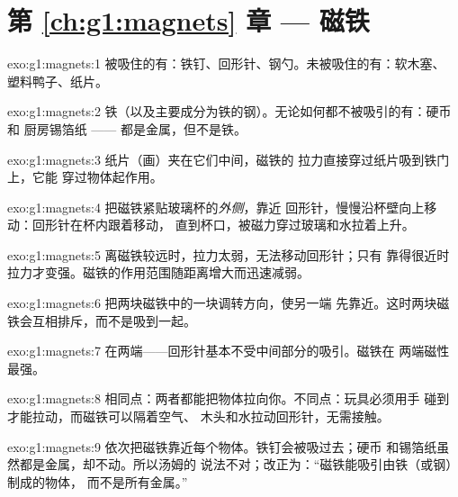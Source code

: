 \section*{第 \ref{ch:g1:magnets} 章 --- 磁铁}

\begin{solution}{exo:g1:magnets:1}
被吸住的有：铁钉、回形针、钢勺。未被吸住的有：软木塞、
塑料鸭子、纸片。
\end{solution}

\begin{solution}{exo:g1:magnets:2}
铁（以及主要成分为铁的钢）。无论如何都不被吸引的有：硬币和
厨房锡箔纸 —— 都是金属，但不是铁。
\end{solution}

\begin{solution}{exo:g1:magnets:3}
纸片（画）夹在它们中间，磁铁的
拉力直接穿过纸片吸到铁门上，它能
穿过物体起作用。
\end{solution}

\begin{solution}{exo:g1:magnets:4}
把磁铁紧贴玻璃杯的\emph{外侧}，靠近
回形针，慢慢沿杯壁向上移动：回形针在杯内跟着移动，
直到杯口，被磁力穿过玻璃和水拉着上升。
\end{solution}

\begin{solution}{exo:g1:magnets:5}
离磁铁较远时，拉力太弱，无法移动回形针；只有
靠得很近时拉力才变强。磁铁的作用范围随距离增大而迅速减弱。
\end{solution}

\begin{solution}{exo:g1:magnets:6}
把两块磁铁中的一块调转方向，使另一端
先靠近。这时两块磁铁会互相排斥，而不是吸到一起。
\end{solution}

\begin{solution}{exo:g1:magnets:7}
在两端——回形针基本不受中间部分的吸引。磁铁在
两端磁性最强。
\end{solution}

\begin{solution}{exo:g1:magnets:8}
相同点：两者都能把物体拉向你。不同点：玩具必须用手
碰到才能拉动，而磁铁可以隔着空气、
木头和水拉动回形针，无需接触。
\end{solution}

\begin{solution}{exo:g1:magnets:9}
依次把磁铁靠近每个物体。铁钉会被吸过去；硬币
和锡箔纸虽然都是金属，却不动。所以汤姆的
说法不对；改正为：“磁铁能吸引由铁（或钢）制成的物体，
而不是所有金属。”
\end{solution}
